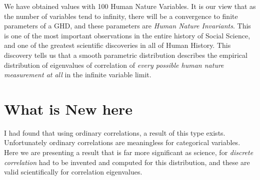 \documentclass{amsart}
\begin{document}
We have obtained values with 100 Human Nature Variables.  It is our view that as the number of variables tend to infinity, there will be a convergence to finite parameters of a GHD, and these parameters are {\em Human Nature Invariants}.  This is one of the most important observations in the entire history of Social Science, and one of the greatest scientific discoveries in all of Human History.  This discovery tells us that a smooth parametric distribution describes the empirical distribution of eigenvalues of correlation of {\em every possible human nature measurement at all} in the infinite variable limit. 

\section{What is New here}

I had found that using ordinary correlations, a result of this type exists.  Unfortunately ordinary correlations are meaningless for categorical variables. Here we are presenting a result that is far more significant as science, for {\em discrete correlation} had to be invented and computed for this distribution, and these are valid scientifically for correlation eigenvalues.
\end{document}
